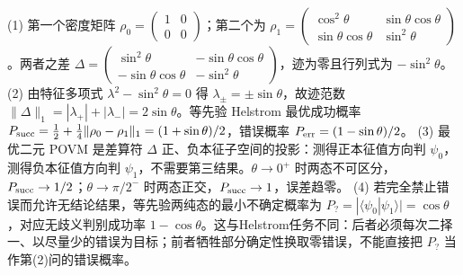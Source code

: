 (1) 第一个密度矩阵 \(\rho_0=\begin{pmatrix}1&0\\0&0\end{pmatrix}\)；第二个为 \(\rho_1=\begin{pmatrix}\cos^2\theta&\sin\theta\cos\theta\\\sin\theta\cos\theta&\sin^2\theta\end{pmatrix}\)。两者之差 \(\Delta=\begin{pmatrix}\sin^2\theta&-\sin\theta\cos\theta\\-\sin\theta\cos\theta&-\sin^2\theta\end{pmatrix}\)，迹为零且行列式为 \(-\sin^2\theta\)。
(2) 由特征多项式 \(\lambda^2-\sin^2\theta=0\) 得 \(\lambda_\pm=\pm\sin\theta\)，故迹范数 \(\|\Delta\|_1=|\lambda_+|+|\lambda_-|=2\sin\theta\)。等先验 Helstrom 最优成功概率 \(P_{\rm succ}=\frac12+\frac14\|\rho_0-\rho_1\|_1=(1+\sin\theta)/2\)，错误概率 \(P_{\rm err}=(1-\sin\theta)/2\)。
(3) 最优二元 POVM 是差算符 \(\Delta\) 正、负本征子空间的投影：测得正本征值方向判 \(\psi_0\)，测得负本征值方向判 \(\psi_1\)，不需要第三结果。\(\theta\to0^+\) 时两态不可区分，\(P_{\rm succ}\to1/2\)；\(\theta\to\pi/2^-\) 时两态正交，\(P_{\rm succ}\to1\)，误差趋零。
(4) 若完全禁止错误而允许无结论结果，等先验两纯态的最小不确定概率为 \(P_?=|\langle\psi_0|\psi_1\rangle|=\cos\theta\)，对应无歧义判别成功率 \(1-\cos\theta\)。这与Helstrom任务不同：后者必须每次二择一、以尽量少的错误为目标；前者牺牲部分确定性换取零错误，不能直接把 \(P_?\) 当作第(2)问的错误概率。
